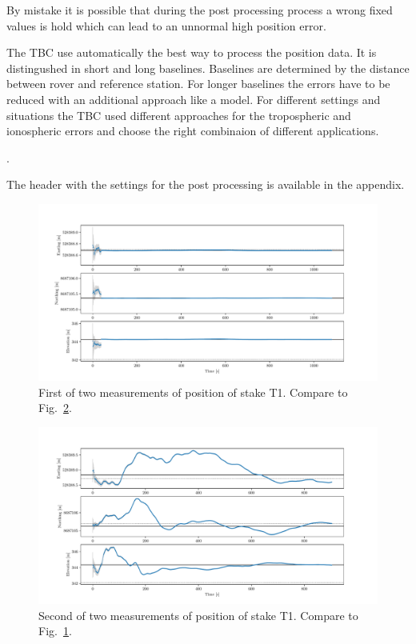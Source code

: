 By mistake it is possible that during the post processing process a wrong fixed values is hold which can lead to an unnormal high position error.

The TBC use automatically the best way to process the position data. 
It is distingushed in short and long baselines.
Baselines are determined by the distance between rover and reference station.
For longer baselines the errors have to be reduced with an additional approach like a model.
For different settings and situations the TBC used different approaches for the tropospheric and ionospheric errors and choose the right combinaion of different applications.

\citep{Trprocess}.

The header with the settings for the post processing is available in the appendix.

\begin{figure}[H]
    \centering
    \includegraphics[width=\textwidth]{./figs/timeseries/46250700_corr-T1-i-2017_Timeseries-east-north-elev.pdf}
    \caption{First of two measurements of position of stake T1. Compare to Fig.~\ref{GF:fig:T1-ii_timeseries}.}
    \label{GF:fig:T1-i_timeseries}
\end{figure}


\begin{figure}[H]
    \centering
    \includegraphics[width=\textwidth]{./figs/timeseries/46250723_corr-T1-ii-2017_Timeseries-east-north-elev.pdf}
    \caption{Second of two measurements of position of stake T1. Compare to Fig.~\ref{GF:fig:T1-i_timeseries}.}
    \label{GF:fig:T1-ii_timeseries}
\end{figure}


